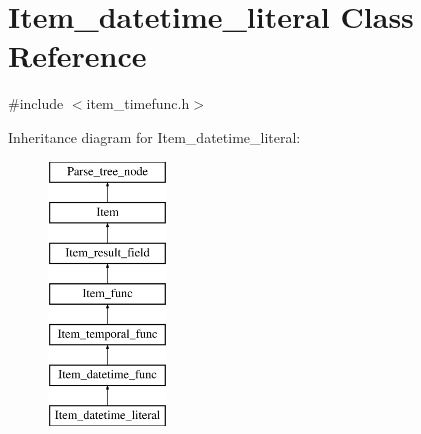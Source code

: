 \hypertarget{classItem__datetime__literal}{}\section{Item\+\_\+datetime\+\_\+literal Class Reference}
\label{classItem__datetime__literal}


{\ttfamily \#include $<$item\+\_\+timefunc.\+h$>$}

Inheritance diagram for Item\+\_\+datetime\+\_\+literal\+:\begin{figure}[H]
\begin{center}
\leavevmode
\includegraphics[height=7.000000cm]{classItem__datetime__literal}
\end{center}
\end{figure}
